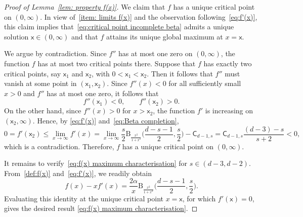 \documentclass{amsart}
\theoremstyle{plain}
\theoremstyle{remark}
\numberwithin{equation}{section}
\begin{document}
\begin{proof}[Proof of Lemma~\ref{lem: property f(x)}]
We claim that $f$ has a unique critical point on $(0,\infty)$. In view
of~\ref{item: limits f(x)} and the observation following~\eqref{eq:f'(x)},
this claim implies that~\eqref{eq:critical point incomplete beta} admits
a unique solution $\mathsf{x}\in(0,\infty)$ and that $f$ attains its
unique global maximum at $x=\mathsf{x}$.

We argue by contradiction. Since $f''$ has at most one zero on
$(0,\infty)$, the function $f$ has at most two critical points there.
Suppose that $f$ has exactly two critical points, say
$\mathsf{x}_1$ and $\mathsf{x}_2$, with $0<\mathsf{x}_1<\mathsf{x}_2$. Then it follows that $f''$ must vanish at
some point in $(\mathsf{x}_1,\mathsf{x}_2)$. Since $f''(x)<0$ for all
sufficiently small $x>0$ and $f''$ has at most one zero, it follows that
\[
    f''(\mathsf{x}_1)<0, \qquad f''(\mathsf{x}_2)>0.
\]
On the other hand, since $f''(x)>0$ for $x>\mathsf{x}_2$, the function
$f'$ is increasing on $(\mathsf{x}_2,\infty)$. Hence, by
\eqref{eq:f'(x)} and~\eqref{eq:Beta completion}, 
\[
    0=f'(\mathsf{x}_2)\le \lim_{x\to\infty}f'(x) = \lim_{x\to\infty}\frac{s}{2}\mathrm{B}_{\frac{x^2}{1+x^2}}\Big(\frac{d-s-1}{2},\frac{s}{2}\Big)-\mathsf{C}_{d-1,s} = \mathsf{C}_{d-1,s}\frac{(d-3)-s}{s+2}<0,
\]
which is a contradiction. Therefore, $f$ has a unique critical point
on $(0,\infty)$.  

It remains to verify~\eqref{eq:f(x) maximum characterisation} for
$s\in(d-3,d-2)$. From~\eqref{def:f(x)} and~\eqref{eq:f'(x)}, we readily obtain 
\begin{equation}
    f(x)-xf'(x)= \frac{2\alpha}{x}\mathrm{B}_{\frac{x^2}{1+x^2}}\Big(\frac{d-s-1}{2},\frac{s}{2}\Big).
\end{equation}
Evaluating this identity at the unique critical point $x=\mathsf{x}$,
for which $f'(\mathsf{x})=0$, gives the desired result \eqref{eq:f(x) maximum characterisation}. 
\end{proof}

 
\end{document}
